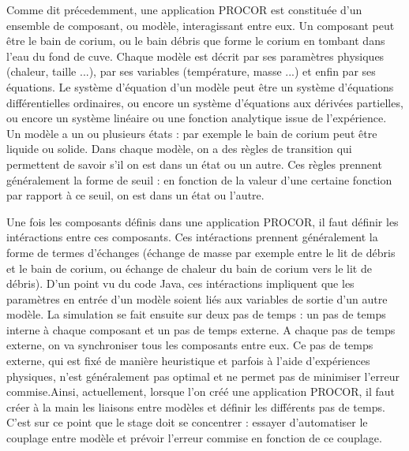 Comme dit précedemment, une application PROCOR est constituée d'un ensemble de composant, ou modèle, interagissant entre eux. Un composant peut être le bain de corium, ou le bain débris que forme le corium en tombant dans 
l'eau du fond de cuve. Chaque modèle est décrit par ses paramètres physiques (chaleur, taille ...), par ses variables (température, masse ...) et enfin par ses équations. Le système d'équation d'un modèle peut 
être un système d'équations différentielles ordinaires, ou encore un système d'équations aux dérivées partielles, ou encore un système linéaire ou une fonction analytique issue de l'expérience. Un modèle a un ou plusieurs états : par 
exemple le bain de corium peut être liquide ou solide. Dans chaque modèle, on a des règles de transition qui permettent de savoir s'il on est dans un état ou un autre. Ces règles prennent généralement la forme de seuil : en fonction
de la valeur d'une certaine fonction par rapport à ce seuil, on est dans un état ou l'autre. 

Une fois les composants définis dans une application PROCOR, il faut définir les intéractions entre ces composants. Ces intéractions prennent généralement la forme de termes d'échanges (échange de masse par exemple entre 
le lit de débris et le bain de corium, ou échange de chaleur du bain de corium vers le lit de débris). D'un point vu du code Java, ces intéractions impliquent que les paramètres en entrée d'un modèle soient liés aux variables de 
sortie d'un autre modèle. La simulation se fait ensuite sur deux pas de temps : un pas de temps interne à chaque composant et un pas de temps externe. A chaque pas de temps externe, on va synchroniser tous les composants entre eux. 
Ce pas de temps externe, qui est fixé de manière heuristique et parfois à l'aide d'expériences physiques, n'est généralement pas optimal et ne permet pas de minimiser l'erreur commise.Ainsi, actuellement, lorsque l'on créé 
une application PROCOR, il faut créer à la main les liaisons entre modèles et définir les différents pas de temps. C'est sur ce point que le stage doit se concentrer : essayer d'automatiser le couplage entre modèle et prévoir
l'erreur commise en fonction de ce couplage.